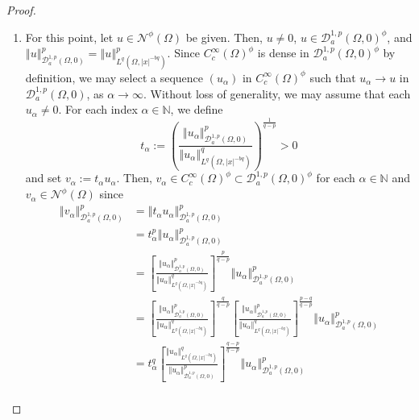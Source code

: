 \documentclass[10pt, reqno]{amsart}
\newcommand{\NN}{\mathbb{N}}
\newcommand{\Om}{\Omega}
\newcommand{\abs}[1]{\left\vert #1 \right\vert}
\newcommand{\norm}[1]{\left\Vert #1 \right\Vert}
\newcommand{\D}{\mathcal{D}}
\newcommand{\N}{\mathcal{N}}
\numberwithin{equation}{section}
\theoremstyle{definition}
\theoremstyle{remark}
\theoremstyle{plain}
\begin{document}
\begin{proof}
\begin{enumerate}[leftmargin=*]
\begin{align*}
			\end{align*}
			Consequently, for all paths $\gamma \in \Gamma$, we have $\kappa(\gamma(0)) = 0$ and $\kappa(\gamma(1)) > 1$ so that (by the Intermediate Value Theorem) there exists $t_1 \in (0,1)$ with the property that $\kappa(\gamma(t_1)) = 1$. Then, $\gamma(t_1) \in \N^\phi(\Om)$ and 
			\[
			\max_{t \in [0,1]} J(\gamma(t)) \ge J(\gamma(t_1)) \ge c^\phi(\Om).
			\]
			As this holds for all paths $\gamma \in \Gamma$, we deduce that
			\[
			\inf_{\gamma \in \Gamma} \max_{t \in [0,1]} J(\gamma(t)) \ge c^\phi(\Om),
			\]
			whence 
			\[
			\inf_{\gamma \in \Gamma} \max_{t \in [0,1]} J(\gamma(t)) = c^\phi(\Om),
			\]
			as was asserted.
			\item For this point, let $u \in \N^\phi(\Om)$ be given. Then, $u \ne 0$, $u \in \D^{1,p}_a(\Om,0)^\phi$, and $\norm{u}_{\D^{1,p}_a(\Om,0)}^p =\norm{u}_{L^q(\Om,\abs{x}^{-bq})}^p$. Since $C_c^\infty(\Om)^\phi$ is dense in $\D_a^{1,p}(\Om,0)^\phi$ by definition, we may select a sequence $(u_\alpha)$ in $C_c^\infty(\Om)^\phi$ such that $u_\alpha \to u$ in $\D_a^{1,p}(\Om,0)$, as $ \alpha \to \infty$. Without loss of generality, we may assume that each $u_\alpha\ne 0$. For each index $\alpha \in \NN$, we define
			\[
			t_\alpha := \left(\frac{\norm{u_\alpha}_{\D_a^{1,p}(\Om,0)}^p}{ \norm{u_\alpha}^q_{L^q(\Om,\abs{x}^{-bq})} } \right)^{\frac{1}{q-p}} > 0
			\]
			and set $v_\alpha := t_\alpha u_\alpha$. Then, $v_\alpha \in C_c^\infty(\Om)^\phi \subset \D^{1,p}_a(\Om,0)^\phi$ for each $\alpha \in\NN$ and $v_\alpha \in \N^\phi(\Om)$ since
			\begingroup
			\small
			\begin{align*}
				\norm{v_\alpha}_{\D_a^{1,p}(\Om,0)}^p&= \norm{t_\alpha u_\alpha}_{\D_a^{1,p}(\Om,0)}^p \\
				&= t_\alpha^p \norm{ u_\alpha}_{\D_a^{1,p}(\Om,0)}^p\\
				&= \left[\frac{\norm{u_\alpha}_{\D_a^{1,p}(\Om,0)}^p}{ \norm{u_\alpha}^q_{L^q(\Om,\abs{x}^{-bq})} } \right]^{\frac{p}{q-p}}  \norm{ u_\alpha}_{\D_a^{1,p}(\Om,0)}^p\\
				&= \left[\frac{\norm{u_\alpha}_{\D_a^{1,p}(\Om,0)}^p}{ \norm{u_\alpha}^q_{L^q(\Om,\abs{x}^{-bq})} } \right]^{\frac{q}{q-p}} \left[\frac{\norm{u_\alpha}_{\D_a^{1,p}(\Om,0)}^p}{ \norm{u_\alpha}^q_{L^q(\Om,\abs{x}^{-bq})} } \right]^{\frac{p-q}{q-p}}   \norm{ u_\alpha}_{\D_a^{1,p}(\Om,0)}^p\\
				&= t_\alpha^q  \left[\frac{ \norm{u_\alpha}^q_{L^q(\Om,\abs{x}^{-bq})}}{\norm{u_\alpha}_{\D_a^{1,p}(\Om,0)}^p} \right]^{\frac{q-p}{q-p}}   \norm{ u_\alpha}_{\D_a^{1,p}(\Om,0)}^p\\

\end{align*}
\end{enumerate}
\end{proof}
\end{document}
